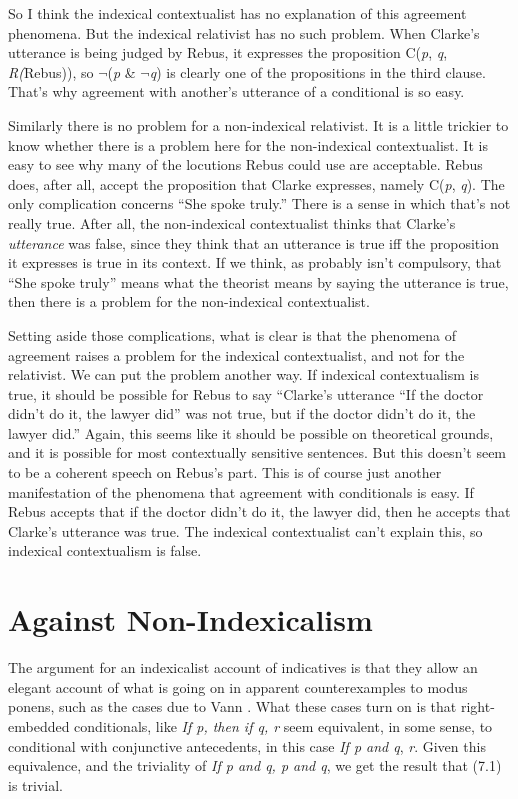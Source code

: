 So I think the indexical contextualist has no explanation of this agreement phenomena. But the indexical relativist has no such problem. When Clarke's utterance is being judged by Rebus, it expresses the proposition C(\textit{p}, \textit{q}, \textit{R(}Rebus)), so \(\neg\){}(\textit{p} \& \(\neg\){}\textit{q}) is clearly one of the propositions in the third clause. That's why agreement with another's utterance of a conditional is so easy.

Similarly there is no problem for a non-indexical relativist. It is a little trickier to know whether there is a problem here for the non-indexical contextualist. It is easy to see why many of the locutions Rebus could use are acceptable. Rebus does, after all, accept the proposition that Clarke expresses, namely C(\textit{p}, \textit{q}). The only complication concerns ``She spoke truly.'' There is a sense in which that's not really true. After all, the non-indexical contextualist thinks that Clarke's \textit{utterance} was false, since they think that an utterance is true iff the proposition it expresses is true in its context. If we think, as probably isn't compulsory, that ``She spoke truly'' means what the theorist means by saying the utterance is true, then there is a problem for the non-indexical contextualist.

Setting aside those complications, what is clear is that the phenomena of agreement raises a problem for the indexical contextualist, and not for the relativist. We can put the problem another way. If indexical contextualism is true, it should be possible for Rebus to say ``Clarke's utterance ``If the doctor didn't do it, the lawyer did'' was not true, but if the doctor didn't do it, the lawyer did.'' Again, this seems like it should be possible on theoretical grounds, and it is possible for most contextually sensitive sentences. But this doesn't seem to be a coherent speech on Rebus's part. This is of course just another manifestation of the phenomena that agreement with conditionals is easy. If Rebus accepts that if the doctor didn't do it, the lawyer did, then he accepts that Clarke's utterance was true. The indexical contextualist can't explain this, so indexical contextualism is false.


\section{Against Non-Indexicalism}

The argument for an indexicalist account of indicatives is that they allow an elegant account of what is going on in apparent counterexamples to modus ponens, such as the cases due to Vann \citet{McGee1985}. What these cases turn on is that right-embedded conditionals, like \textit{If p, then if q, r} seem equivalent, in some sense, to conditional with conjunctive antecedents, in this case \textit{If p and q}, \textit{r}. Given this equivalence, and the triviality of \textit{If p and q, p and q}, we get the result that (7.1) is trivial.

